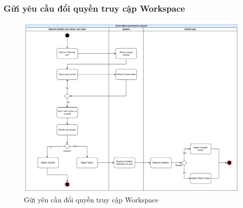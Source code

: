 \subsubsection{Gửi yêu cầu đổi quyền truy cập Workspace}
    \begin{figure}[H]
        \centering
        \includegraphics[width=\linewidth]{Content/Phân tích và thiết kế hệ thống/documents/Sơ đồ hoạt động/images/sendAdjustPermissionRequest.png}
        \vspace{0.5cm}
        \caption{Gửi yêu cầu đổi quyền truy cập Workspace}
        \label{fig:Gửi yêu cầu đổi quyền truy cập Workspace}
    \end{figure}